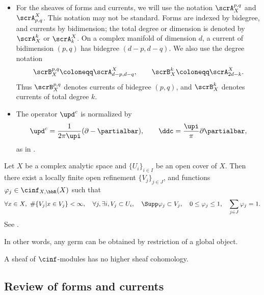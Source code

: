\begin{notation}[label=\labelNFM{notation:complex-geometry}, status=draft, tag=0000000]
\begin{itemize}
		\item For the sheaves of forms and currents, we will use the notation $\scrA_X^{p,q}$ and $\scrA_{p,q}^X$.
		      This notation may not be standard.
		      Forms are indexed by bidegree, and currents by bidimension; the total degree or dimension is denoted by $\scrA_X^k$ or $\scrA_k^X$.
		      On a complex manifold of dimension $d$, a current of bidimension $(p,q)$ has bidegree $(d-p,d-q)$.
		      We also use the degree notation
		      \[ \scrB_X^{p,q} \coloneqq \scrA_{d-p,d-q}^X, \qquad \scrB_X^k \coloneqq \scrA_{2d-k}^X. \]
		      Thus $\scrB_X^{p,q}$ denotes currents of bidegree $(p,q)$, and $\scrB_X^k$ denotes currents of total degree $k$.
		\item The operator $\upd^c$ is normalized by
		      \[
			      \upd^c = \frac{1}{2\pi\upi}(\partial-\partialbar),\qquad
			      \ddc = \frac{\upi}{\pi}\partial\partialbar,
		      \]
		      as in \cite{Demailly-2012-ComplexAnalyticDifferential}.
	\end{itemize}
\end{notation}

\begin{theorem}[label=\labelNFM{thm:partition-of-unit}, status=draft, tag=0000000, title={Partition of unity}]
	Let $X$ be a complex analytic space and $\{U_i\}_{i \in I}$ be an open cover of $X$.
	Then there exist a locally finite open refinement $\{V_j\}_{j \in J}$, and functions $\varphi_j \in \cinf_{X,\bbR}(X)$ such that
	\[ \forall x \in X,\ \#\{V_j | x \in V_j\} < \infty, \quad \forall j, \exists i, V_j \subset U_i, \quad \Supp \varphi_j \subset V_j, \quad 0 \leq \varphi_j \leq 1, \quad \sum_{j \in J} \varphi_j = 1. \]
	See \cite[Proposition 3.2.14]{Barlet-Magnusson-2019-ComplexAnalyticCycles}.
\end{theorem}

In other words, any germ can be obtained by restriction of a global object.


\begin{slogan}
	A sheaf of $\cinf$-modules has no higher sheaf cohomology.
\end{slogan}










\subsection[status=draft,tag=0000000,label=\labelNFM{subsec:forms-and-currents}]{Review of forms and currents}

